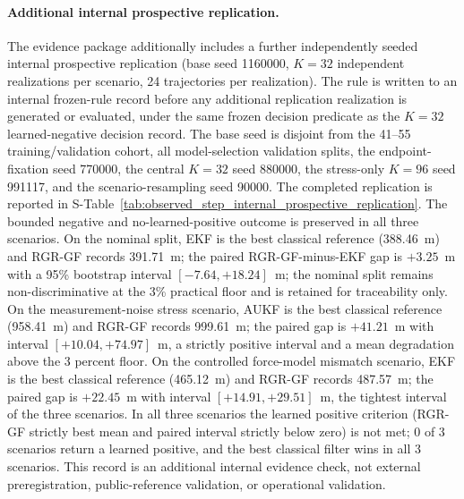 \documentclass{article}
\begin{document}
\paragraph{Additional internal prospective replication.}
The evidence package additionally includes a further independently seeded internal prospective replication (base seed 1160000, $K=32$ independent realizations per scenario, 24 trajectories per realization). The rule is written to an internal frozen-rule record before any additional replication realization is generated or evaluated, under the same frozen decision predicate as the $K=32$ learned-negative decision record. The base seed is disjoint from the 41--55 training/validation cohort, all model-selection validation splits, the endpoint-fixation seed 770000, the central $K=32$ seed 880000, the stress-only $K=96$ seed 991117, and the scenario-resampling seed 90000. The completed replication is reported in S-Table~\ref{tab:observed_step_internal_prospective_replication}. The bounded negative and no-learned-positive outcome is preserved in all three scenarios. On the nominal split, EKF is the best classical reference (388.46~m) and RGR-GF records 391.71~m; the paired RGR-GF-minus-EKF gap is \(+3.25\)~m with a 95\% bootstrap interval \([-7.64,+18.24]\)~m; the nominal split remains non-discriminative at the 3\% practical floor and is retained for traceability only. On the measurement-noise stress scenario, AUKF is the best classical reference (958.41~m) and RGR-GF records 999.61~m; the paired gap is \(+41.21\)~m with interval \([+10.04,+74.97]\)~m, a strictly positive interval and a mean degradation above the 3 percent floor. On the controlled force-model mismatch scenario, EKF is the best classical reference (465.12~m) and RGR-GF records 487.57~m; the paired gap is \(+22.45\)~m with interval \([+14.91,+29.51]\)~m, the tightest interval of the three scenarios. In all three scenarios the learned positive criterion (RGR-GF strictly best mean and paired interval strictly below zero) is not met; 0 of 3 scenarios return a learned positive, and the best classical filter wins in all 3 scenarios. This record is an additional internal evidence check, not external preregistration, public-reference validation, or operational validation.
\end{document}
